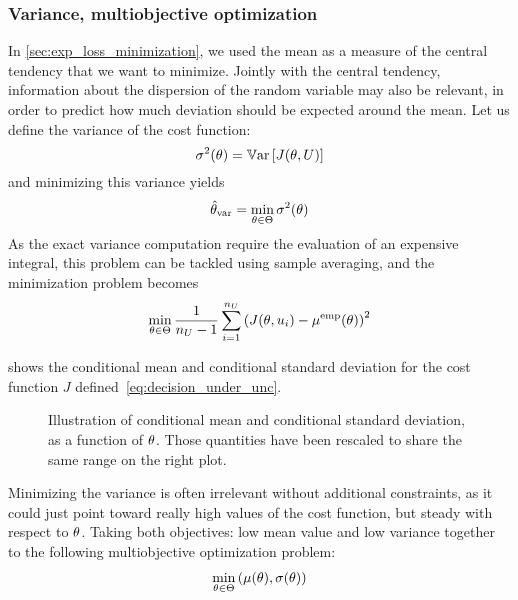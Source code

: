 \documentclass[../../Main_ManuscritThese.tex]{subfiles}
\newcommand\imgpath{/home/victor/acadwriting/Manuscrit/Text/Chapter3/img/}
\begin{document}
\subsubsection{Variance, multiobjective optimization}
\label{sec:multiobjective_optimization}
In \cref{sec:exp_loss_minimization}, we used the mean as a measure of the central tendency that we want to minimize. Jointly with the central tendency, information about the dispersion of the random variable may also be relevant, in order to predict how much deviation should be expected around the mean.
Let us define the variance of the cost function:
\begin{equation}
  \sigma^2(\theta) = \mathbb{V}\mathrm{ar}\left[J(\theta,U)\right]
\end{equation}
and minimizing this variance yields
\begin{equation}
  \hat{\theta}_{\mathrm{var}} = \min_{\theta \in \Theta} \sigma^2(\theta)
\end{equation}
As the exact variance computation require the evaluation of an expensive integral, this problem can be tackled using sample averaging, and the minimization problem becomes
\begin{equation}
  \min_{\theta\in \Theta} \frac{1}{n_{U}-1} \sum_{i=1}^{n_{U}} \left(J(\theta, u_i) - \mu^{\mathrm{emp}}(\theta)\right)^2
\end{equation}

 shows the conditional mean and conditional standard deviation for the cost function $J$ defined~\cref{eq:decision_under_unc}.
\begin{figure}[ht]
  \centering
  
  \caption{Illustration of conditional mean and conditional standard deviation, as a function of $\theta$. Those quantities have been rescaled to share the same range on the right plot.}
  \label{fig:mean_std} 
\end{figure}

Minimizing the variance is often irrelevant without additional constraints, as it could just point toward really high values of the cost function, but steady with respect to $\theta$. Taking both objectives: low mean value and low variance together to the following multiobjective optimization problem:
\begin{align}
  \label{eq:multiobj_e_var}
  \min_{\theta\in\Theta} \left(\mu(\theta),\sigma(\theta)\right)
\end{align}
\end{document}
